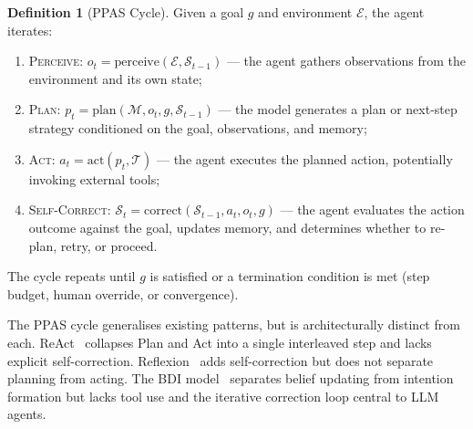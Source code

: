 \documentclass[review]{elsarticle}
\theoremstyle{definition}
\newtheorem{definition}{Definition}
\begin{document}
\begin{definition}[PPAS Cycle]
Given a goal $g$ and environment $\mathcal{E}$, the agent iterates:
\begin{enumerate}
    \item \textsc{Perceive}: $o_t = \text{perceive}(\mathcal{E}, \mathcal{S}_{t-1})$ --- the agent gathers observations from the environment and its own state;
    \item \textsc{Plan}: $p_t = \text{plan}(\mathcal{M}, o_t, g, \mathcal{S}_{t-1})$ --- the model generates a plan or next-step strategy conditioned on the goal, observations, and memory;
    \item \textsc{Act}: $a_t = \text{act}(p_t, \mathcal{T})$ --- the agent executes the planned action, potentially invoking external tools;
    \item \textsc{Self-Correct}: $\mathcal{S}_t = \text{correct}(\mathcal{S}_{t-1}, a_t, o_t, g)$ --- the agent evaluates the action outcome against the goal, updates memory, and determines whether to re-plan, retry, or proceed.
\end{enumerate}
The cycle repeats until $g$ is satisfied or a termination condition is met (step budget, human override, or convergence).
\end{definition}

The PPAS cycle generalises existing patterns, but is architecturally distinct from each. ReAct~\citep{yao2023react} collapses Plan and Act into a single interleaved step and lacks explicit self-correction. Reflexion~\citep{shinn2023reflexion} adds self-correction but does not separate planning from acting. The BDI model~\citep{rao1995bdi} separates belief updating from intention formation but lacks tool use and the iterative correction loop central to LLM agents.
\end{document}
